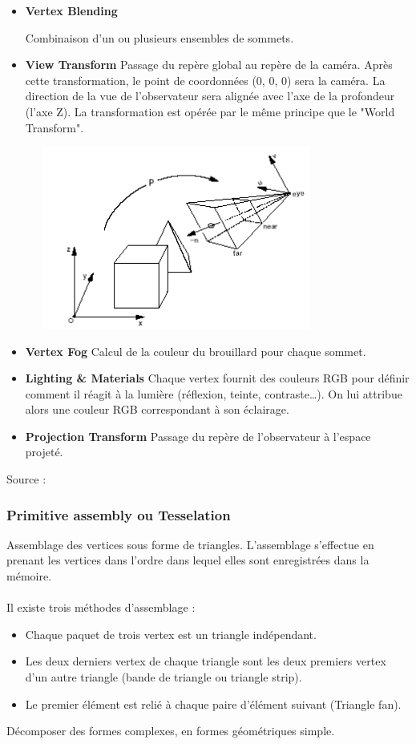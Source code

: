 \begin{itemize}
	\item{\textbf{Vertex Blending}}

Combinaison d’un ou plusieurs ensembles de sommets.
\\
	\item{\textbf{View Transform}}
Passage du repère global au repère de la caméra. Après cette transformation, le point de coordonnées (0, 0, 0) sera la caméra. La direction de la vue de l’observateur sera alignée avec l'axe de la profondeur (l'axe Z). La transformation est opérée par le même principe que le "World Transform".
\\
\begin{center}
\includegraphics[width=10cm,height=60mm]{pipeline/images/repereCamera.png}
\end{center}

	\item{\textbf{Vertex Fog}}
Calcul de la couleur du brouillard pour chaque sommet.
\\
	\item{\textbf{Lighting \& Materials}}
Chaque vertex fournit des couleurs RGB pour définir comment il réagit à la lumière (réflexion, teinte, contraste…). On lui attribue alors une couleur RGB correspondant à son éclairage.
\\
	\item{\textbf{Projection Transform}}
Passage du repère de l'observateur à l'espace projeté.
\\
\end{itemize}

Source : \cite{pipeline3}

\subsubsection{Primitive assembly ou Tesselation}
Assemblage des vertices sous forme de triangles. L’assemblage s’effectue en prenant les vertices dans l’ordre dans lequel elles sont enregistrées dans la mémoire.
\\\\
Il existe trois méthodes d’assemblage :
\begin{itemize}
	\item Chaque paquet de trois vertex est un triangle indépendant.
	\item Les deux derniers vertex de chaque triangle sont les deux premiers vertex d’un autre triangle (bande de triangle ou triangle strip).
	\item Le premier élément est relié à chaque paire d’élément suivant (Triangle fan).
	\end{itemize}
Décomposer des formes complexes, en formes géométriques simple.

